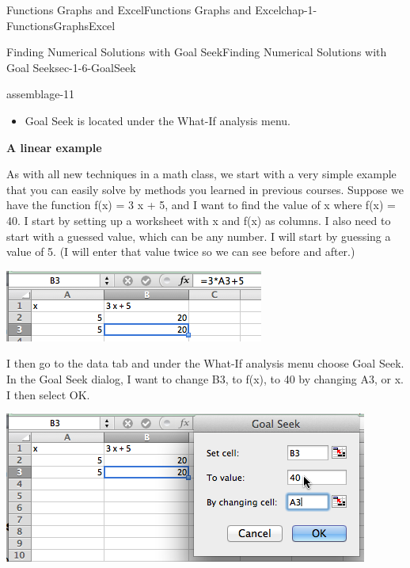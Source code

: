 \documentclass[oneside,10pt,]{book}
\newcommand{\terminology}[1]{\textbf{#1}}
\numberwithin{equation}{section}
\begin{document}
\begin{chapterptx}{Functions Graphs and Excel}{}{Functions Graphs and Excel}{}{}{chap-1-FunctionsGraphsExcel}
\begin{sectionptx}{Finding Numerical Solutions with Goal Seek}{}{Finding Numerical Solutions with Goal Seek}{}{}{sec-1-6-GoalSeek}
\begin{assemblage}{}{assemblage-11}
\begin{itemize}[label=\textbullet]
\item{}\hypertarget{p-470}{}%
Goal Seek is located under the What-If analysis menu.%
\end{itemize}
%
\end{assemblage}
\hypertarget{p-471}{}%
\terminology{A linear example}%
\par
\hypertarget{p-472}{}%
As with all new techniques in a math class, we start with a very simple example that you can easily solve by methods you learned in previous courses.  Suppose we have the function f(x) = 3 x + 5, and I want to find the value of x where f(x) = 40.  I start by setting up a worksheet with x and f(x) as columns.  I also need to start with a guessed value, which can be any number.  I will start by guessing a value of 5.  (I will enter that value twice so we can see before and after.) \leavevmode%
\begin{sidebyside}{1}{0.1}{0.1}{0}%
\begin{sbspanel}{0.8}%
\includegraphics[width=1\linewidth]{images/sec1-6-1.png}
\end{sbspanel}%
\end{sidebyside}%
%
\par
\hypertarget{p-473}{}%
I then go to the data tab and under the What-If analysis menu choose Goal Seek.  In the Goal Seek dialog, I want to change B3, to f(x), to 40 by changing A3, or x.  I then select OK. \leavevmode%
\begin{sidebyside}{1}{0.1}{0.1}{0}%
\begin{sbspanel}{0.8}%
\includegraphics[width=1\linewidth]{images/sec1-6-2.png}
\end{sbspanel}%

\end{sidebyside}
\end{sectionptx}
\end{chapterptx}
\end{document}
